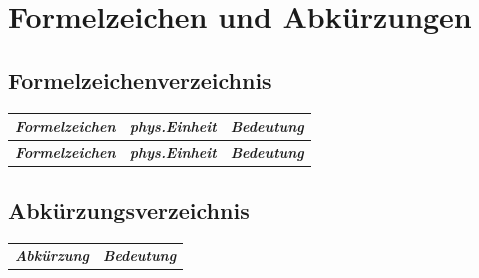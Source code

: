 \chapter*{Formelzeichen und Abk\"urzungen}

\section*{Formelzeichenverzeichnis}
\enlargethispage{-4cm}

\renewcommand{\arraystretch}{1.3}
\setlength{\tabcolsep}{30pt}
\begin{longtable}[l]{l l l}
\bfseries \emph{Formelzeichen}& \bfseries \emph{phys.Einheit} &\bfseries \emph{Bedeutung}\\
\endfirsthead
\bfseries \emph{Formelzeichen}& \bfseries \emph{phys.Einheit} &\bfseries \emph{Bedeutung}\\
\endhead

\end{longtable}

\clearpage
\section*{Abk\"urzungsverzeichnis}

\begin{table}[!h]
\setlength{\tabcolsep}{50pt}
	\centering
		\begin{tabular}[t]{l l}
\bfseries \emph{Abk\"urzung}& \bfseries \emph{Bedeutung}\\

		\end{tabular}

\end{table}
\normalsize
\normalfont

